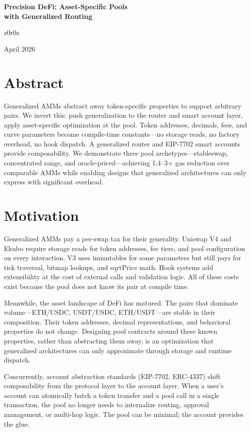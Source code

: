 \documentclass[10pt,twocolumn]{article}
\renewcommand{\maketitle}{%
  \begin{center}
    {\large\bfseries Precision DeFi: Asset-Specific Pools\\with Generalized Routing\par}
    \vspace{4pt}
    {\normalsize z0r0z\par}
    \vspace{2pt}
    {\small April 2026\par}
  \end{center}
  \vspace{-4pt}
}
\begin{document}
\maketitle

\section*{Abstract}

\small
Generalized AMMs abstract away token-specific properties to support arbitrary pairs. We invert this: push generalization to the router and smart account layer, apply asset-specific optimization at the pool. Token addresses, decimals, fees, and curve parameters become compile-time constants---no storage reads, no factory overhead, no hook dispatch. A generalized router and EIP-7702 smart accounts provide composability. We demonstrate three pool archetypes---stableswap, concentrated range, and oracle-priced---achieving 1.4--3$\times$ gas reduction over comparable AMMs while enabling designs that generalized architectures can only express with significant overhead.

\normalsize

\section{Motivation}

Generalized AMMs pay a per-swap tax for their generality. Uniswap V4 and Ekubo require storage reads for token addresses, fee tiers, and pool configuration on every interaction. V3 uses immutables for some parameters but still pays for tick traversal, bitmap lookups, and sqrtPrice math. Hook systems add extensibility at the cost of external calls and validation logic. All of these costs exist because the pool does not know its pair at compile time.

Meanwhile, the asset landscape of DeFi has matured. The pairs that dominate volume---ETH/USDC, USDT/USDC, ETH/USDT---are stable in their composition. Their token addresses, decimal representations, and behavioral properties do not change. Designing pool contracts around these known properties, rather than abstracting them away, is an optimization that generalized architectures can only approximate through storage and runtime dispatch.

Concurrently, account abstraction standards (EIP-7702, ERC-4337) shift composability from the protocol layer to the account layer. When a user's account can atomically batch a token transfer and a pool call in a single transaction, the pool no longer needs to internalize routing, approval management, or multi-hop logic. The pool can be minimal; the account provides the glue.
\end{document}
